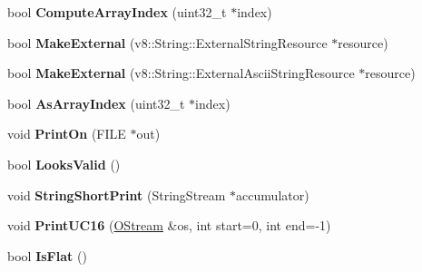 \begin{DoxyCompactItemize}
\item 
\hypertarget{classv8_1_1internal_1_1_string_a46b7030df3a7c7205e72ba4bc2eb3fdc}{}bool {\bfseries Compute\+Array\+Index} (uint32\+\_\+t $\ast$index)\label{classv8_1_1internal_1_1_string_a46b7030df3a7c7205e72ba4bc2eb3fdc}

\item 
\hypertarget{classv8_1_1internal_1_1_string_a8b6bd85bd67adbe826a3743eb67f180d}{}bool {\bfseries Make\+External} (v8\+::\+String\+::\+External\+String\+Resource $\ast$resource)\label{classv8_1_1internal_1_1_string_a8b6bd85bd67adbe826a3743eb67f180d}

\item 
\hypertarget{classv8_1_1internal_1_1_string_a20140229dc102e00460556fa4622a8e2}{}bool {\bfseries Make\+External} (v8\+::\+String\+::\+External\+Ascii\+String\+Resource $\ast$resource)\label{classv8_1_1internal_1_1_string_a20140229dc102e00460556fa4622a8e2}

\item 
\hypertarget{classv8_1_1internal_1_1_string_ac7d26984c3671ba8b7238b4b6df9ec15}{}bool {\bfseries As\+Array\+Index} (uint32\+\_\+t $\ast$index)\label{classv8_1_1internal_1_1_string_ac7d26984c3671ba8b7238b4b6df9ec15}

\item 
\hypertarget{classv8_1_1internal_1_1_string_a13c247344e2d0ad2f85f97884dc7e789}{}void {\bfseries Print\+On} (F\+I\+L\+E $\ast$out)\label{classv8_1_1internal_1_1_string_a13c247344e2d0ad2f85f97884dc7e789}

\item 
\hypertarget{classv8_1_1internal_1_1_string_a8d7708a3d1b99d34cb0bd52a80ae5e06}{}bool {\bfseries Looks\+Valid} ()\label{classv8_1_1internal_1_1_string_a8d7708a3d1b99d34cb0bd52a80ae5e06}

\item 
\hypertarget{classv8_1_1internal_1_1_string_a01a2a3b88a627a1759ec18185c6d3b8f}{}void {\bfseries String\+Short\+Print} (String\+Stream $\ast$accumulator)\label{classv8_1_1internal_1_1_string_a01a2a3b88a627a1759ec18185c6d3b8f}

\item 
\hypertarget{classv8_1_1internal_1_1_string_a989d4f5df57edcc095ac0e2be26da2c7}{}void {\bfseries Print\+U\+C16} (\hyperlink{classv8_1_1internal_1_1_o_stream}{O\+Stream} \&os, int start=0, int end=-\/1)\label{classv8_1_1internal_1_1_string_a989d4f5df57edcc095ac0e2be26da2c7}

\item 
\hypertarget{classv8_1_1internal_1_1_string_a67b81848ea2df3c46e3ff2af9148317e}{}bool {\bfseries Is\+Flat} ()\label{classv8_1_1internal_1_1_string_a67b81848ea2df3c46e3ff2af9148317e}


\end{DoxyCompactItemize}
